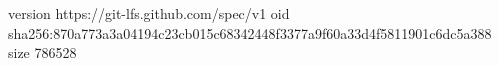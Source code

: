 version https://git-lfs.github.com/spec/v1
oid sha256:870a773a3a04194c23cb015c68342448f3377a9f60a33d4f5811901c6dc5a388
size 786528
